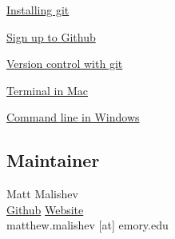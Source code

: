 \documentclass[10,portrait]{article}
\begin{document}
\href{https://git-scm.com/book/en/v2/Getting-Started-Installing-Git}{Installing
git}

\href{https://github.com/}{Sign up to Github}

\href{https://git-scm.com/book/en/v2/Getting-Started-About-Version-Control}{Version
control with git}

\href{https://macpaw.com/how-to/use-terminal-on-mac}{Terminal in Mac}

\href{https://www.computerhope.com/issues/chusedos.htm}{Command line in
Windows}

\href{}{}

\subsection{Maintainer}\label{maintainer}

Matt Malishev\\
\href{https://github.com/darwinanddavis}{Github} \textbar{}
\href{https://www.researchgate.net/profile/Matt_Malishev}{Website}\\
matthew.malishev {[}at{]} emory.edu

\printbibliography
\end{document}
